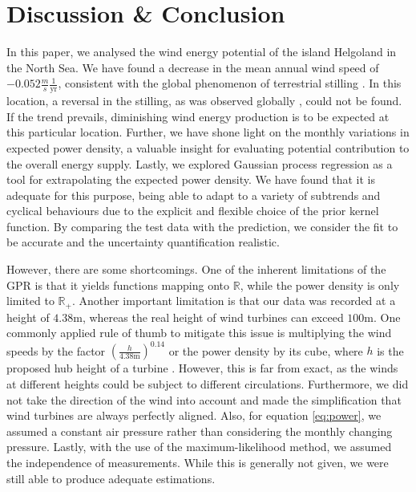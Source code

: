 \documentclass{article}
\theoremstyle{plain}
\theoremstyle{definition}
\theoremstyle{remark}
\newcommand{\R}{\mathbb{R}}
\begin{document}
\section{Discussion \& Conclusion}\label{sec:conclusion}
In this paper, we analysed the wind energy potential of the island Helgoland in the North Sea.  We
have found a decrease in the mean annual wind speed of $-0.052 \frac{m}{s}  \frac{1}{\mathrm{yr}}$,
consistent with the global phenomenon of terrestrial stilling \cite{stilling}. In this location, a
reversal in the stilling, as  was observed globally \cite{stilling-reversal}, could not be found. If
the trend prevails, diminishing wind energy production is to be expected at this particular
location.  Further, we have shone light on the monthly variations in expected power density, a
valuable insight for evaluating potential contribution to the overall energy supply.  Lastly, we
explored Gaussian process regression as a tool for extrapolating the expected power density.  We
have found that it is adequate for this purpose, being able to adapt to a variety of subtrends and
cyclical behaviours due to the explicit and flexible choice of the prior kernel function. By
comparing the test data with the prediction, we consider the fit to be accurate and the uncertainty
quantification realistic.

However, there are some shortcomings. One of the inherent limitations of the GPR is that it yields
functions mapping onto $\R$, while the power density is only limited to $\R_+$.
Another important limitation is that our data was recorded at a height of $4.38 \mathrm{m}$, whereas
the real height of wind turbines can exceed $100 \mathrm{m}$. One commonly applied rule of thumb to
mitigate this issue is multiplying the wind speeds by the factor $\left(\frac{h}{4.38 \mathrm{m}}
\right)^{0.14}$ or the power density by its cube, where $h$ is the  proposed hub height of a turbine
\citep{statanalysis}. However, this is far from exact, as the winds at different heights could be
subject to different circulations.  Furthermore, we did not take the direction of the wind into
account and made the simplification that wind turbines are always perfectly aligned.  Also, for
equation \eqref{eq:power}, we assumed a constant air pressure rather than considering the monthly
changing pressure.  Lastly, with the use of the maximum-likelihood method, we assumed the
independence of measurements. While this is generally not given, we were still able to produce
adequate estimations.
\end{document}
